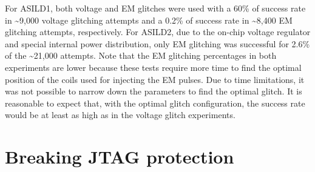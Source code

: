 \documentclass[a4paper, 10pt]{article}
\newcommand{\TI}{ASILD1\xspace}
\newcommand{\ST}{ASILD2\xspace}
\begin{document}
For \TI, both voltage and EM glitches were used with a 60\% of success rate in \textasciitilde9,000 voltage glitching attempts and a 0.2\% of success rate in \textasciitilde8,400 EM glitching attempts, respectively. For \ST, due to the on-chip voltage regulator and special internal power distribution, only EM glitching was successful for 2.6\% of the \textasciitilde21,000 attempts. Note that the EM glitching percentages in both experiments are lower because these tests require more time to find the optimal position of the coils used for injecting the EM pulses. Due to time limitations, it was not possible to narrow down the parameters to find the optimal glitch. It is reasonable to expect that, with the optimal glitch configuration, the success rate would be at least as high as in the voltage glitch experiments.





\section{Breaking JTAG protection}
\label{sec:jtag}

		
\end{document}
